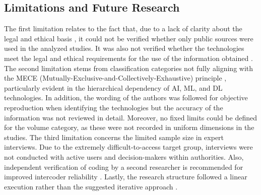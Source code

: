 \documentclass[10pt]{article}
\begin{document}
\subsection{Limitations and Future Research}

The first limitation relates to the fact that, due to a lack of clarity about the legal
and ethical basis \cite{Ghioni.2023,Wittmer.2022},
it could not be verified whether only public sources \cite{NorthAtlanticTreatyOrganization.2002} were used
in the analyzed studies. It was also not verified whether the technologies meet the
legal and ethical requirements for the use of the information obtained
\cite{PastorGalindo.2020,Wittmer.2022}. The second
limitation stems from classification categories not fully aligning with the
MECE (Mutually-Exclusive-and-Collectively-Exhaustive) principle \cite{Lee.2018},
particularly evident in the hierarchical dependency of AI, ML, and DL technologies. In addition,
the wording of the authors was followed for objective reproduction when identifying the technologies
but the accuracy of the information was not reviewed in detail. Moreover, no fixed limits could be defined
for the volume category, as these were not recorded in uniform dimensions in the studies.
The third limitation concerns the limited sample size in expert interviews. Due to the
extremely difficult-to-access target group, interviews were not conducted with active users and decision-makers within authorities.
Also, independent verification of coding by a second researcher is recommended for improved intercoder reliability
\cite{Bogner.2002c, Glaser.2009}. Lastly, the research structure followed a linear execution rather than the suggested iterative approach \cite{Peffers.2007}.
\end{document}
